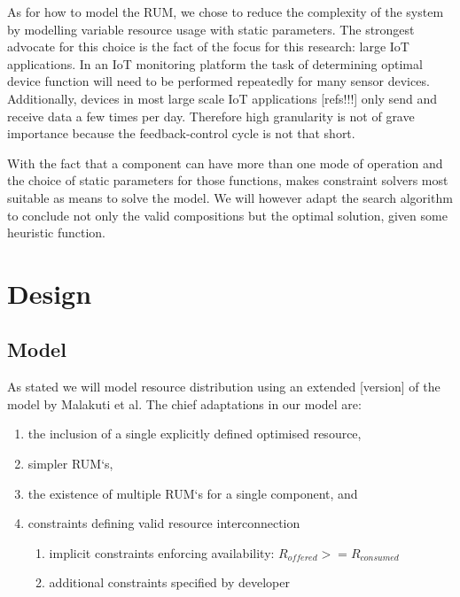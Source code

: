 As for how to model the RUM, we chose to reduce the complexity of the system by modelling variable resource usage with static parameters. The strongest advocate for this choice is the fact of the focus for this research: large IoT applications. In an IoT monitoring platform the task of determining optimal device function will need to be performed repeatedly for many sensor devices. Additionally, devices in most large scale IoT applications [refs!!!] only send and receive data a few times per day. Therefore high granularity is not of grave importance because the feedback-control cycle is not that short. 

With the fact that a component can have more than one mode of operation and the choice of static parameters for those functions, makes constraint solvers most suitable as means to solve the model. We will however adapt the search algorithm to conclude not only the valid compositions but the optimal solution, given some heuristic function.

\section{Design}
\subsection{Model}
As stated we will model resource distribution using an extended [version] of the model by Malakuti et al\cite{steven_te_brinke}. The chief adaptations in our model are:
\begin{enumerate}
\item the inclusion of a single explicitly defined optimised resource,
\item simpler RUM`s,
\item the existence of multiple RUM`s for a single component, and
\item constraints defining valid resource interconnection
\begin{enumerate}
\item implicit constraints enforcing availability: $R_{offered} >= R_{consumed}$
\item additional constraints specified by developer
\end{enumerate}
\end{enumerate}

